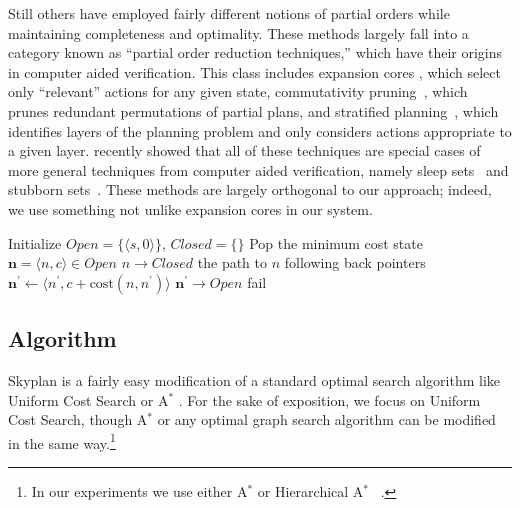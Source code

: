 \documentclass[letterpaper]{article}
\theoremstyle{plain} \newtheorem{theorem}{Theorem} \newtheorem{proposition}{Proposition} \newtheorem{lemma}{Lemma}
\theoremstyle{definition} \newtheorem{definition}{Definition} \newtheorem{conjecture}{Conjecture} \newtheorem*{example}{Example}
\theoremstyle{remark} \newtheorem*{remark}{Remark} \newtheorem*{note}{Note} \newtheorem{case}{Case}
\newcommand{\Astar}{A$^*$ }
\begin{document}
Still others have employed fairly different notions of partial
orders while maintaining completeness and optimality. These methods
largely fall into a category known as ``partial order reduction
techniques,'' which have their origins in computer aided verification.
This class includes expansion cores \citep{chen09completeness,
xu11theory}, which select only ``relevant'' actions for any given
state, commutativity pruning~\citep{geffner2000admissible}, which
prunes redundant permutations of partial plans, and stratified
planning~\citep{chen2009stratified}, which identifies layers of the
planning problem and only considers actions appropriate to a given
layer. \citet{wehrle2012partial} recently showed that all of these
techniques are special cases of more general techniques from computer
aided verification, namely sleep sets~\citep{godefroid96partial}
and stubborn sets~\citep{valmari92stubborn}. These methods are
largely orthogonal to our approach; indeed, we use something not
unlike expansion cores in our system.



\begin{algorithm}[t!]
  \begin{algorithmic}[1]
    \State Initialize $\textit{Open}=\{\langle s,0\rangle\}$, $\textit{Closed}=\{\}$
    \State Pop the minimum cost state $\mathbf{n} = \langle n,c\rangle\in \textit{Open}$
    \State $n\rightarrow \textit{Closed}$
        \State \Return the path to $n$ following back pointers
      \EndIf
        \State $\mathbf{n^\prime} \gets \langle n^\prime,c+\mathrm{cost}(n,n^\prime)\rangle$
        \State $\mathbf{n^\prime} \rightarrow \textit{Open}$
        \EndFor
      \EndIf
    \EndWhile
    \State fail
  \EndProcedure
  \end{algorithmic}
\caption{A version of Skyplan based on uniform cost search.  }
\label{alg:skyplan}
\end{algorithm}

\subsection{Algorithm}

Skyplan is a fairly easy modification of a standard
optimal search algorithm like Uniform Cost Search or \Astar. For
the sake of exposition, we focus on Uniform Cost Search, though
\Astar or any optimal graph search algorithm can be modified in the
same way.\footnote{In our experiments we use either \Astar or
Hierarchical \Astar~\citep{holte1996hierarchical}.}
\end{document}
